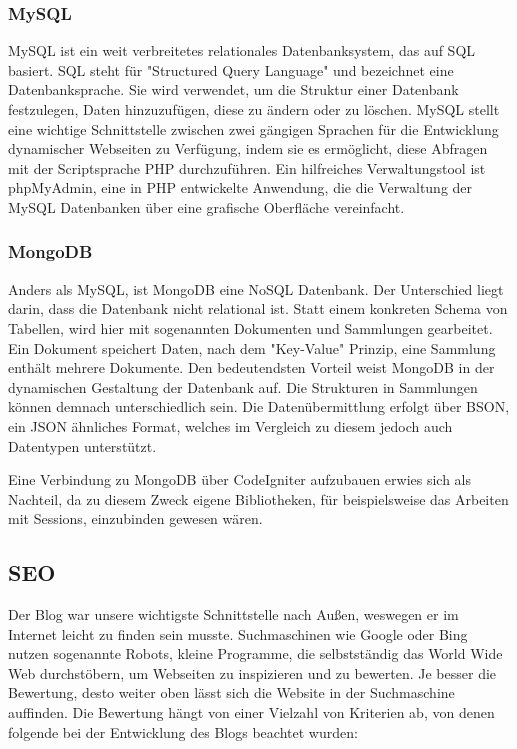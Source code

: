 {        \subsubsection*{MySQL}
        MySQL ist ein weit verbreitetes relationales Datenbanksystem, das auf SQL basiert. SQL steht für "Structured Query Language" und bezeichnet eine Datenbanksprache.
        Sie wird verwendet, um die Struktur einer Datenbank festzulegen, Daten hinzuzufügen, diese zu ändern oder zu löschen. MySQL stellt eine wichtige Schnittstelle zwischen zwei gängigen Sprachen für
        die Entwicklung dynamischer Webseiten zu Verfügung, indem sie es ermöglicht, diese Abfragen mit der Scriptsprache PHP durchzuführen. Ein hilfreiches Verwaltungstool ist phpMyAdmin,
        eine in PHP entwickelte Anwendung, die die Verwaltung der MySQL Datenbanken über eine grafische Oberfläche vereinfacht.

        \subsubsection*{MongoDB}
        Anders als MySQL, ist {MongoDB\cite{mongodb}} eine NoSQL Datenbank. Der Unterschied liegt darin, dass die Datenbank nicht relational ist. Statt einem konkreten Schema von Tabellen,
        wird hier mit sogenannten Dokumenten und Sammlungen gearbeitet. Ein Dokument speichert Daten, nach dem "Key-Value" Prinzip, eine Sammlung enthält mehrere Dokumente.
        Den bedeutendsten Vorteil weist MongoDB in der dynamischen Gestaltung der Datenbank auf. Die Strukturen in Sammlungen können demnach unterschiedlich sein. Die
        Datenübermittlung erfolgt über {BSON\cite{bson}}, ein JSON ähnliches Format, welches im Vergleich zu diesem jedoch auch Datentypen unterstützt.

        Eine Verbindung zu MongoDB über CodeIgniter aufzubauen erwies sich als Nachteil, da zu diesem Zweck eigene Bibliotheken, für beispielsweise das Arbeiten mit Sessions,
        einzubinden gewesen wären.

    \subsection*{SEO}
    Der Blog war unsere wichtigste Schnittstelle nach Außen, weswegen er im Internet leicht zu finden sein musste. Suchmaschinen wie Google oder Bing nutzen
    sogenannte Robots, kleine Programme, die selbstständig das World Wide Web durchstöbern, um Webseiten zu inspizieren und zu bewerten. Je besser die Bewertung,
    desto weiter oben lässt sich die Website in der Suchmaschine auffinden.
    Die Bewertung hängt von einer Vielzahl von Kriterien ab, von denen folgende bei der Entwicklung des Blogs beachtet wurden:

}
